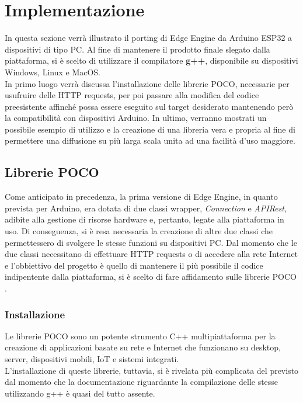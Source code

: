 \chapter{Implementazione}
In questa sezione verrà illustrato il porting di Edge Engine da Arduino ESP32 a dispositivi di tipo PC. Al fine di mantenere il prodotto finale slegato dalla piattaforma, si è scelto di utilizzare il compilatore \textbf{g++}, disponibile su dispositivi Windows, Linux e MacOS.\\
In primo luogo verrà discussa l’installazione delle librerie POCO, necessarie per usufruire delle HTTP requests, per poi passare alla modifica del codice preesistente affinché possa essere eseguito sul target desiderato mantenendo però la compatibilità con dispositivi Arduino. In ultimo, verranno mostrati un possibile esempio di utilizzo e la creazione di una libreria vera e propria al fine di permettere una diffusione su più larga scala unita ad una facilità d'uso maggiore.
\section{Librerie POCO}
Come anticipato in precedenza, la prima versione di Edge Engine, in quanto prevista per Arduino, era dotata di due classi wrapper, \textit{Connection} e \textit{APIRest}, adibite alla gestione di risorse hardware e, pertanto, legate alla piattaforma in uso. Di conseguenza, si è resa necessaria la creazione di altre due classi che permettessero di svolgere le stesse funzioni su dispositivi PC. Dal momento che le due classi necessitano di effettuare HTTP requests o di accedere alla rete Internet e l’obbiettivo del progetto è quello di mantenere il più possibile il codice indipentente dalla piattaforma, si è scelto di fare affidamento sulle librerie POCO \cite{POCO}.
\subsection{Installazione}
Le librerie POCO sono un potente strumento C++ multipiattaforma per la creazione di applicazioni basate su rete e Internet che funzionano su desktop, server, dispositivi mobili, IoT e sistemi integrati.\\
L’installazione di queste librerie, tuttavia, si è rivelata più complicata del previsto dal momento che la documentazione riguardante la compilazione delle stesse utilizzando g++ è quasi del tutto assente.\\
